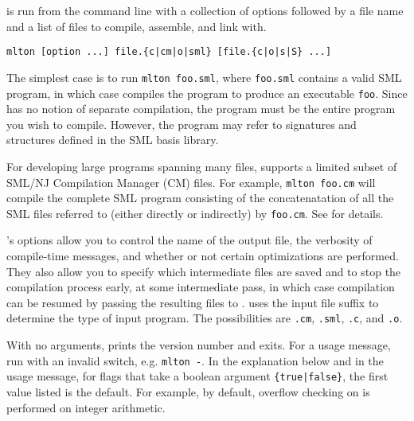 %
{\mlton} is run from the command line with a collection of options
followed by a file name and a list of files to compile, assemble, and
link with.
\begin{verbatim}
mlton [option ...] file.{c|cm|o|sml} [file.{c|o|s|S} ...]
\end{verbatim}
The simplest case is to run {\tt mlton foo.sml}, where {\tt foo.sml}
contains a valid SML program, in which case {\mlton} compiles the
program to produce an executable {\tt foo}.  Since {\mlton} has
no notion of separate compilation, the program must be the entire
program you wish to compile.  However, the program may refer to
signatures and structures defined in the SML basis library.

For developing large programs spanning many files, {\mlton} supports a
limited subset of SML/NJ Compilation Manager (CM) files.  For example,
{\tt mlton foo.cm} will compile the complete SML program consisting of
the concatenatation of all the SML files referred to (either directly
or indirectly) by {\tt foo.cm}.  See  for details.
%

{\mlton}'s options allow you to control the name of the output file,
the verbosity of compile-time messages, and whether or not certain
optimizations are performed.  They also allow you to specify which
intermediate files are saved and to stop the compilation process
early, at some intermediate pass, in which case compilation can be
resumed by passing the resulting files to {\mlton}.  {\mlton} uses the
input file suffix to determine the type of input program.  The
possibilities are {\tt .cm}, {\tt .sml}, {\tt .c}, and {\tt .o}.

With no arguments, {\mlton} prints the version number and exits.  For
a usage message, run {\mlton} with an invalid switch, e.g. {\tt mlton
-}.  In the explanation below and in the usage message, for flags
that take a boolean argument {\tt \{true|false\}}, the first value
listed is the default.  For example, by default, overflow checking on
is performed on integer arithmetic.

\newcommand{\option}[1]{\item[{\tt #1}]\hspace{1em}\\}


